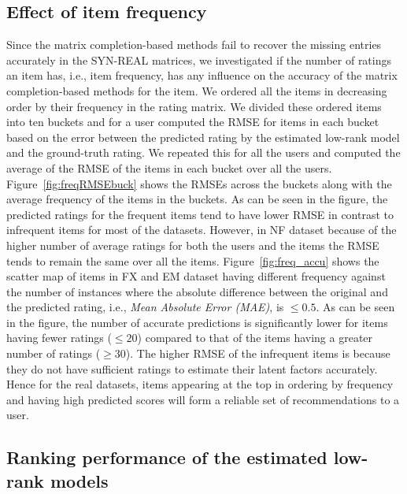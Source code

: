 \subsection*{Effect of item frequency} \label{freqeff}
Since the matrix completion-based methods fail to recover the missing entries
accurately in the SYN-REAL matrices, we
investigated if the number of ratings an item has, i.e., item frequency, has any
influence on the accuracy of the matrix completion-based methods for the item.
We ordered all the items in decreasing order by their frequency in the
rating matrix. We divided these ordered items into ten buckets and for a
user computed the RMSE for items in each bucket based on the error between the
predicted rating by the estimated low-rank model and the ground-truth rating. We repeated this for all the
users and computed the average of the RMSE of the items in each bucket over all the users. 
Figure~\ref{fig:freqRMSEbuck} shows the RMSEs across the buckets along with the
average frequency of the items in the buckets.
As can be seen in the figure, the predicted ratings
for the frequent items tend to have lower RMSE in contrast to infrequent items
for most of the datasets. However, in NF dataset because of the higher number of
average ratings for both the users and the items the RMSE tends to remain the
same over all the items.
Figure~\ref{fig:freq_accu} shows the scatter map of items in FX and EM dataset having different frequency
against the number of instances where the absolute difference between the
original and the predicted rating, i.e., \emph{Mean Absolute Error (MAE)},  is
$\le 0.5$. 
As can be seen in the figure, the number of accurate predictions is
significantly lower for items having fewer ratings ($\le 20$) compared to that of
the items having a greater number of ratings ($\ge 30$). 
The higher RMSE of the infrequent items is
because they do not have sufficient ratings to estimate their latent
factors accurately. 
Hence for the real datasets, items appearing at the top in ordering by
frequency and having high predicted scores will form a reliable set of recommendations to a user.  


\subsection{Ranking performance of the estimated low-rank models} \label{ch:matcomp:mf_rank}

